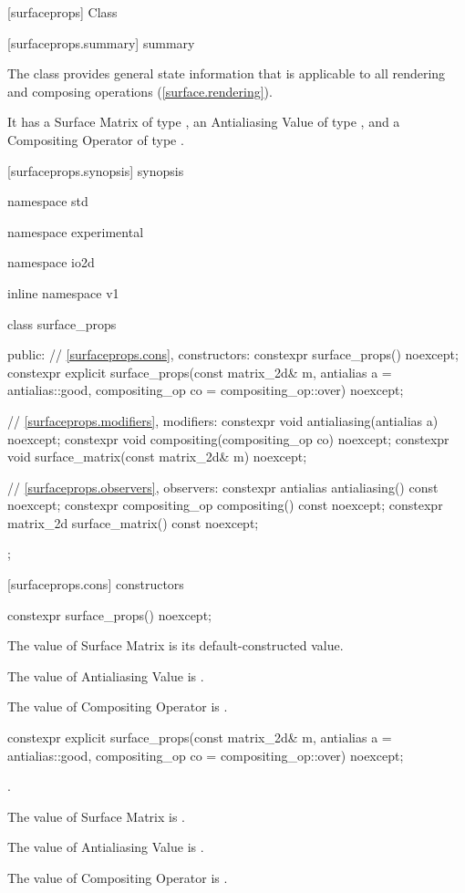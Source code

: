 
 [surfaceprops] {Class }

 [surfaceprops.summary] { summary}

\pnum
The  class provides general state information that is applicable to all rendering and composing operations (\ref{surface.rendering}).

\pnum
It has a Surface Matrix of type , an Antialiasing Value of type , and a Compositing Operator of type .

 [surfaceprops.synopsis] { synopsis}

\begin{codeblock}
namespace std { namespace experimental { namespace io2d { inline namespace v1 {
  class surface_props {
  public:
    // \ref{surfaceprops.cons}, constructors:
    constexpr surface_props() noexcept;
    constexpr explicit surface_props(const matrix_2d& m,
      antialias a = antialias::good,
      compositing_op co = compositing_op::over) noexcept;
    
    // \ref{surfaceprops.modifiers}, modifiers:
    constexpr void antialiasing(antialias a) noexcept;
    constexpr void compositing(compositing_op co) noexcept;
    constexpr void surface_matrix(const matrix_2d& m) noexcept;
    
    // \ref{surfaceprops.observers}, observers:
    constexpr antialias antialiasing() const noexcept;
    constexpr compositing_op compositing() const noexcept;
    constexpr matrix_2d surface_matrix() const noexcept;
  };
}}}}
\end{codeblock}

 [surfaceprops.cons] { constructors}

\begin{itemdecl}
constexpr surface_props() noexcept;
\end{itemdecl}
\begin{itemdescr}
\pnum
\effects
The value of Surface Matrix is its default-constructed value.

\pnum
The value of Antialiasing Value is .

\pnum
The value of Compositing Operator is .
\end{itemdescr}

\begin{itemdecl}
constexpr explicit surface_props(const matrix_2d& m,
  antialias a = antialias::good,
  compositing_op co = compositing_op::over) noexcept;
\end{itemdecl}
\begin{itemdescr}
\pnum
\preconditions
{}.

\pnum
\effects
The value of Surface Matrix is .

\pnum
The value of Antialiasing Value is .

\pnum
The value of Compositing Operator is .
\end{itemdescr}

